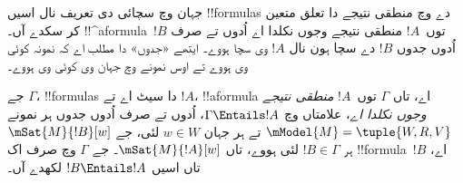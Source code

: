 \documentclass[../../../include/open-logic-section]{subfiles}
\begin{document}


\begin{explain}
  جہان وچ سچائی دی تعریف نال اسیں !!{formula}s دے وچ منطقی نتیجے دا تعلق متعین کر سکدے آں۔ !!^a{formula}~$!B$ توں~$!A$ منطقی نتیجے وجوں نکلدا اے اُدوں تے صرف اُدوں جدوں $!B$ دے سچا ہون نال $!A$ وی سچا ہووے۔ ایتھے «جدوں» دا مطلب اے کہ نمونہ کوئی وی ہووے تے اوس نمونے وچ جہان وی کوئی وی ہووے۔
\end{explain}

\begin{defn}
  جے $\Gamma$، !!{formula}s دا سیٹ اے تے $!A$، !!a{formula} اے، تاں $\Gamma$ توں~$!A$ \emph{منطقی نتیجے وجوں نکلدا اے}، علامتاں وچ $\Gamma \Entails !A$، اُدوں تے صرف اُدوں جدوں ہر نمونے $\mModel{M} = \tuple{W, R, V}$ تے ہر جہان
  $w \in W$ لئی، جے $\mSat{M}{!B}[w]$ ہر $!B \in \Gamma$ لئی ہووے، تاں
  $\mSat{M}{!A}[w]$۔ جے $\Gamma$ وچ صرف اک !!{formula}~$!B$ اے، تاں اسیں $!B \Entails !A$ لکھدے آں۔
\end{defn}
\end{document}
